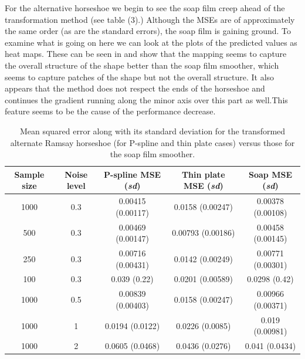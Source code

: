 For the alternative horseshoe we begin to see the soap film creep ahead of the transformation method (see table (3).) Although the MSEs are of approximately the same order (as are the standard errors), the soap film is gaining ground. To examine what is going on here we can look at the plots of the predicted values as heat maps. These can be seen in  and show that the \sch mapping seems to capture the overall structure of the shape better than the soap film smoother, which seems to capture patches of the shape but not the overall structure. It also appears that the \sch method does not respect the ends of the horseshoe and continues the gradient running along the minor axis over this part as well.This feature seems to be the cause of the performance decrease.

\begin{table}[ht]
\begin{tabular}{c c c c c}\\
Sample size & Noise level & P-spline MSE (\emph{sd}) & Thin plate MSE (\emph{sd}) & Soap MSE (\emph{sd}) \\
\hline
\hline
1000 & 0.3 & 0.00415 (0.00117) & 0.0158 (0.00247) & 0.00378 (0.00108) \\ 
500 & 0.3 & 0.00469 (0.00147) & 0.00793 (0.00186) & 0.00458 (0.00145) \\ 
250 & 0.3 & 0.00716 (0.00431) & 0.0142 (0.00249) & 0.00771 (0.00301) \\ 
100 & 0.3 & 0.039 (0.22) & 0.0201 (0.00589) & 0.0298 (0.42) \\ 
1000 & 0.5 & 0.00839 (0.00403) & 0.0158 (0.00247) & 0.00966 (0.00371) \\ 
1000 & 1 & 0.0194 (0.0122) & 0.0226 (0.0085) & 0.019 (0.00981) \\ 
1000 & 2 & 0.0605 (0.0468) & 0.0436 (0.0276) & 0.041 (0.0434) \\ 
\end{tabular}
\label{altramsayresultstable}
\caption{Mean squared error along with its standard deviation for the transformed alternate Ramsay horseshoe (for P-spline and thin plate cases) versus those for the soap film smoother.}
\end{table}

